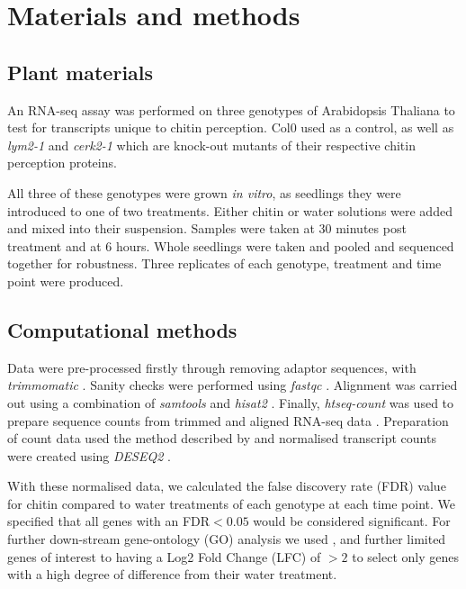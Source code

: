 \documentclass[../main.tex]{subfiles}
\begin{document}
\section{Materials and methods}

\subsection{Plant materials}
An RNA-seq assay was performed on three genotypes of Arabidopsis Thaliana to
test for transcripts unique to chitin perception. Col0 used as a control,
as well as \textit{lym2-1} and \textit{cerk2-1} which are knock-out mutants of
their respective chitin perception proteins. 

All three of these genotypes were grown \textit{in vitro}, as seedlings they
were introduced to one of two treatments. Either chitin or water solutions were
added and mixed into their suspension. Samples were taken at 30 minutes post
treatment and at 6 hours. Whole seedlings were taken and pooled and sequenced
together for robustness. Three replicates of each genotype, treatment and time
point were produced.


\subsection{Computational methods}

Data were pre-processed firstly through removing adaptor sequences, with
\textit{trimmomatic} \cite{bolgerTrimmomaticFlexibleTrimmer2014}. Sanity checks
were performed using \textit{fastqc} \cite{andrewsBabrahamBioinformaticsFastQC}.
Alignment was carried out using a combination of \textit{samtools} and
\textit{hisat2} \cite{liSequenceAlignmentMap2009}. Finally, \textit{htseq-count}
was used to prepare sequence counts from trimmed and aligned RNA-seq data
\cite{kimHISATFastSpliced2015}. Preparation of count data used the method
described by \citet{loveModeratedEstimationFold2014a} and normalised transcript
counts were created using \textit{DESEQ2}
\cite{piperCountNormalizationDESeq22017}.

With these normalised data, we calculated the false discovery rate (FDR) value
for chitin compared to water treatments of each genotype at each time point. We
specified that all genes with an FDR$< 0.05$ would be considered significant.
For further down-stream gene-ontology (GO) analysis we used
\cite{klopfensteinGOATOOLSPythonLibrary2018}, and further limited genes of
interest to having a Log2 Fold Change (LFC) of $>2$ to select only genes with a
high degree of difference from their water treatment.
\end{document}
